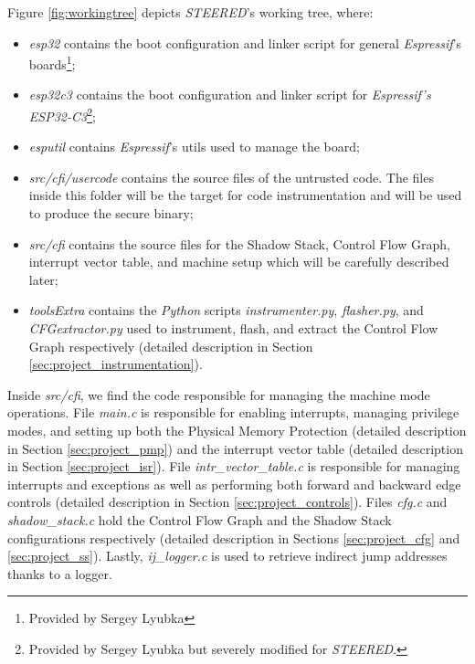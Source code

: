 Figure \ref{fig:workingtree} depicts \textit{STEERED}'s working tree, where:

\begin{itemize}
  \item \textit{esp32} contains the boot configuration and linker script for
    general \textit{Espressif}'s boards\footnote{Provided by Sergey Lyubka};

  \item \textit{esp32c3} contains the boot configuration and linker script for
    \textit{Espressif's ESP32-C3}\footnote{Provided by Sergey Lyubka but
    severely modified for \textit{STEERED}.};

  \item \textit{esputil} contains \textit{Espressif}'s utils used to manage the board;

  \item \textit{src/cfi/usercode} contains the source files of the untrusted
    code. The files inside this folder will be the target for code instrumentation
    and will be used to produce the secure binary;

  \item \textit{src/cfi} contains the source files for the Shadow Stack, Control
    Flow Graph, interrupt vector table, and machine setup which will be carefully
    described later;

  \item \textit{toolsExtra} contains the \textit{Python} scripts \textit{instrumenter.py},
    \textit{flasher.py}, and \textit{CFGextractor.py} used to instrument, flash,
    and extract the Control Flow Graph respectively (detailed description in Section
    \ref{sec:project_instrumentation}).
\end{itemize}

Inside \textit{src/cfi}, we find the code responsible for managing the machine
mode operations. File \textit{main.c} is responsible for enabling interrupts, managing
privilege modes, and setting up both the Physical Memory Protection (detailed description
in Section \ref{sec:project_pmp}) and the interrupt vector table (detailed description
in Section \ref{sec:project_isr}). File \textit{intr\_vector\_table.c} is
responsible for managing interrupts and exceptions as well as performing both
forward and backward edge controls (detailed description in Section \ref{sec:project_controls}).
Files \textit{cfg.c} and \textit{shadow\_stack.c} hold the Control Flow Graph and
the Shadow Stack configurations respectively (detailed description in Sections
\ref{sec:project_cfg} and \ref{sec:project_ss}). Lastly, \textit{ij\_logger.c}
is used to retrieve indirect jump addresses thanks to a logger.

